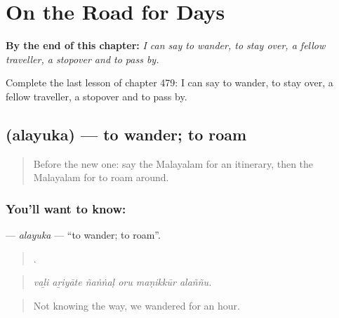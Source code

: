 
\chapter{On the Road for Days}
\label{ch:ml-on-the-road-for-days}

\begin{chapteropening}
\textbf{By the end of this chapter:} \emph{I can say to wander, to stay over, a fellow traveller, a stopover and to pass by.}

Complete the last lesson of chapter 479: I can say to wander, to stay over, a fellow traveller, a stopover and to pass by.
\end{chapteropening}

\section[\texorpdfstring{\ml{അലയുക} (alayuka)}{അലയുക (alayuka)}]{ (alayuka) — to wander; to roam}

\label{lesson:ML-C479-alayuka}



\begin{quote}
Before the new one: say the Malayalam for an itinerary, then the Malayalam for to roam around.
\end{quote}

\subsection*{You'll want to know: }
\textbf{} — \emph{alayuka} — \textquotedblleft{}to wander; to roam\textquotedblright{}.

\begin{quote}
     .
\end{quote}

\begin{quote}
\emph{vaḻi aṟiyāte ñaṅṅaḷ oru maṇikkūr alaññu.}
\end{quote}

\begin{quote}
Not knowing the way, we wandered for an hour.
\end{quote}

